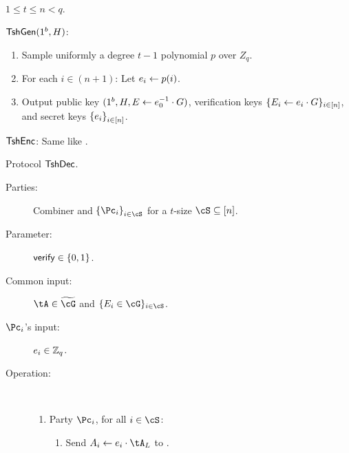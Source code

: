 \newcommand{\verifys}{\mathsf{verify}}
\begin{algorithm}\label{alg:Tsh}~
	
	\item[Paramters:] $1\le t\le n <q$.
	
	
	\item[Key generation (standalone):] $\mathsf{TshGen}(1^b,H)$:
	\begin{enumerate}
		\item Sample   uniformly a degree $t-1$ polynomial  $p$ over $Z_q$. 
		
		\item For each $i\in (n+1)$: Let $e_i \leftarrow p(i)$.
		
		 
		
		 \item Output public key $(1^b,H,E \leftarrow e_0^{-1} \cdot G)$, verification keys $\{E_i \leftarrow e_i  \cdot G\}_{i\in [n]}$, and secret keys $\set{e_i}_{i\in [n]}$.
	\end{enumerate}
	

	
	\item[Encryption:]  $\mathsf{TshEnc}$:  Same like \EgEnc.
	
	
	
	\item[Decryption:] Protocol $\mathsf{TshDec}$.
	
	\begin{description}
		\item[Parties:]   Combiner \Cc and $\set{\Pc_i}_{i\in \cS}$ for a $t$-size $\cS \subseteq [n]$.
		
		\item[Parameter:] $\verifys \in \zo$.
		\item[Common input:] $\tA \in \tcG$ and $\sset{E_i \in \cG}_{i\in \cS}$.
		
		\item[$\Pc_i$'s input:]  $e_i \in {\mathbb Z}_q$.
		
		\item[Operation:]~
		
			\begin{enumerate}
			\item Party $\Pc_i$, for all $i\in \cS$:  
			\begin{enumerate}
				\item 	Send   $A_i \asn e_i \cdot \tA_L$ to \Cc.
				

\end{enumerate}
\end{enumerate}
\end{description}
\end{algorithm}
